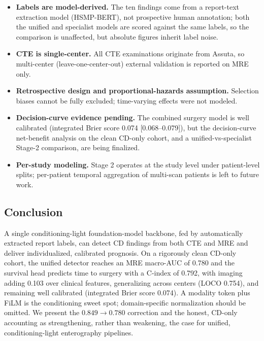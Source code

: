 \documentclass[11pt]{article}
\begin{document}
\begin{itemize}
  \item \textbf{Labels are model-derived.} The ten findings come from a report-text extraction model
        (HSMP-BERT), not prospective human annotation; both the unified and specialist models are scored
        against the same labels, so the comparison is unaffected, but absolute figures inherit label noise.
  \item \textbf{CTE is single-center.} All CTE examinations originate from Assuta, so multi-center
        (leave-one-center-out) external validation is reported on MRE only.
  \item \textbf{Retrospective design and proportional-hazards assumption.} Selection biases cannot be fully
        excluded; time-varying effects were not modeled.
  \item \textbf{Decision-curve evidence pending.} The combined surgery model is well calibrated
        (integrated Brier score 0.074 [0.068--0.079]), but the decision-curve net-benefit analysis on the
        clean CD-only cohort, and a unified-vs-specialist Stage-2 comparison, are being finalized.
  \item \textbf{Per-study modeling.} Stage 2 operates at the study level under patient-level splits;
        per-patient temporal aggregation of multi-scan patients is left to future work.
\end{itemize}

\subsection*{Conclusion}

A single conditioning-light foundation-model backbone, fed by automatically extracted report labels, can
detect CD findings from both CTE and MRE and deliver individualized, calibrated prognosis. On a rigorously
clean CD-only cohort, the unified detector reaches an MRE macro-AUC of 0.780 and the survival head predicts
time to surgery with a C-index of 0.792, with imaging adding 0.103 over clinical features, generalizing
across centers (LOCO 0.754), and remaining well calibrated (integrated Brier score 0.074). A modality
token plus FiLM is the conditioning sweet spot; domain-specific
normalization should be omitted. We present the $0.849 \rightarrow 0.780$ correction and the honest,
CD-only accounting as strengthening, rather than weakening, the case for unified, conditioning-light
enterography pipelines.

\end{document}
